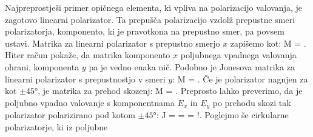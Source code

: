 Najpreprostješi
primer opičnega elementa, ki vpliva na polarizacijo valovanja,
je zagotovo linearni polarizator. Ta prepušča
polarizacijo vzdolž prepustne smeri polarizatorja, komponento, ki
je pravotkona na prepustno smer, pa povsem ustavi. Matrika za
linearni polarizator s prepustno smerjo $x$ zapišemo kot:
\beq
M = \left[\begin{array}{cc}
1 & 0 \\
0 & 0\\
\end{array}\right]\!\!.
\label{eq:03_481}
\eeq
Hiter račun pokaže, da matrika komponento $x$ poljubnega 
vpadnega valovanja ohrani, komponenta $y$ pa je vedno enaka nič. 
Podobno je Jonesova matrika za linearni polarizator s prepustnostjo
v smeri $y$:
\beq
M = \left[\begin{array}{cc}
0 & 0 \\
0 & 1\\
\end{array}\right]\!\!.
\label{eq:03_49}
\eeq
Če je polarizator nagnjen za kot $\pm45\si{\degree}$, je matrika
za prehod skozenj:
\beq
M = \left[\begin{array}{cc}
1 & \pm 1 \\
\pm 1 & 1\\
\end{array}\right]\!\!.
\label{eq:03_50}
\eeq
Preprosto lahko preverimo, da je poljubno vpadno valovanje s komponentnama
$E_x$ in $E_y$ po prehodu skozi tak polarizator polarizirano 
pod kotom $\pm45\si{\degree}$:
\beq
J = \left[\begin{array}{cc}
1 & \pm 1 \\
\pm 1 & 1\\
\end{array}\right]\cdot 
\left[\begin{array}{c}
J_{1x}\\
J_{1y}\\
\end{array}\right]\!\! = 
\left[\begin{array}{c}
J_{1x} \pm J_{1y}\\
\pm J_{1x} + J_{1y}\\
\end{array}\right]\!\!=
\left[\begin{array}{c}
1\\
\pm 1\\
\end{array}\right]\!!.
\label{eq:03_51}
\eeq
Poglejmo še cirkularne polarizatorje, ki iz poljubne
